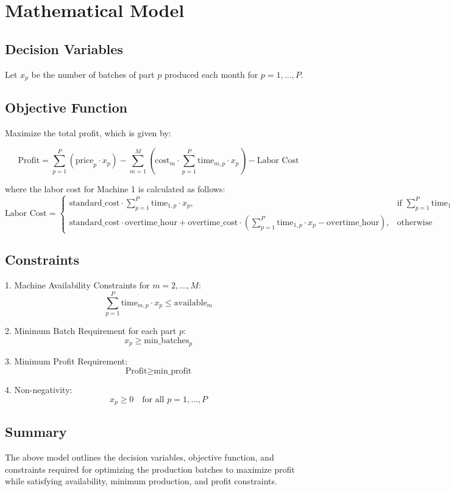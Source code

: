 \documentclass{article}
\begin{document}
\section*{Mathematical Model}

\subsection*{Decision Variables}
Let \( x_p \) be the number of batches of part \( p \) produced each month for \( p = 1, \ldots, P \).

\subsection*{Objective Function}
Maximize the total profit, which is given by:

\[
\text{Profit} = \sum_{p=1}^{P} (\text{price}_p \cdot x_p) - \sum_{m=1}^{M} (\text{cost}_m \cdot \sum_{p=1}^{P} \text{time}_{m,p} \cdot x_p) - \text{Labor Cost}
\]

\noindent where the labor cost for Machine 1 is calculated as follows:
\[
\text{Labor Cost} = 
\begin{cases} 
\text{standard\_cost} \cdot \sum_{p=1}^{P} \text{time}_{1,p} \cdot x_p, & \text{if } \sum_{p=1}^{P} \text{time}_{1,p} \cdot x_p \leq \text{overtime\_hour} \\
\text{standard\_cost} \cdot \text{overtime\_hour} + \text{overtime\_cost} \cdot \left(\sum_{p=1}^{P} \text{time}_{1,p} \cdot x_p - \text{overtime\_hour}\right), & \text{otherwise}
\end{cases}
\]

\subsection*{Constraints}

1. Machine Availability Constraints for \( m = 2, \ldots, M \):
\[
\sum_{p=1}^{P} \text{time}_{m,p} \cdot x_p \leq \text{available}_m
\]

2. Minimum Batch Requirement for each part \( p \):
\[
x_p \geq \text{min\_batches}_p
\]

3. Minimum Profit Requirement:
\[
\text{Profit} \geq \text{min\_profit}
\]

4. Non-negativity:
\[
x_p \geq 0 \quad \text{for all } p = 1, \ldots, P
\]

\subsection*{Summary}

The above model outlines the decision variables, objective function, and constraints required for optimizing the production batches to maximize profit while satisfying availability, minimum production, and profit constraints.
\end{document}
